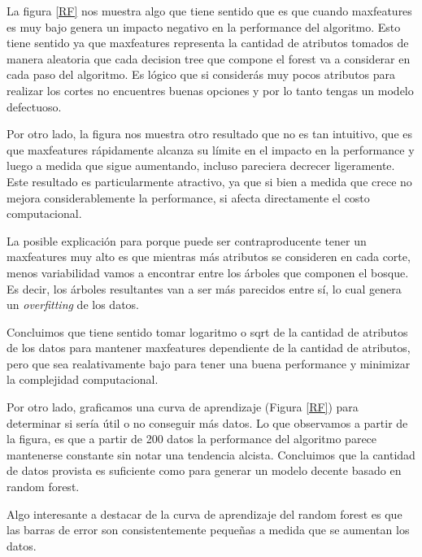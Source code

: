La figura \ref{RF} nos muestra algo que tiene sentido que es que cuando maxfeatures es muy bajo genera un impacto negativo en la performance del algoritmo. Esto tiene sentido ya que maxfeatures representa la cantidad de atributos tomados de manera aleatoria que cada decision tree que compone el forest va a considerar en cada paso del algoritmo. Es lógico que si considerás muy pocos atributos para realizar los cortes no encuentres buenas opciones y por lo tanto tengas un modelo defectuoso.

Por otro lado, la figura nos muestra otro resultado que no es tan intuitivo, que es que maxfeatures rápidamente alcanza su límite en el impacto en la performance y luego a medida que sigue aumentando, incluso pareciera decrecer ligeramente. Este resultado es particularmente atractivo, ya que si bien a medida que crece no mejora considerablemente la performance, si afecta directamente el costo computacional. 

La posible explicación para porque puede ser contraproducente tener un maxfeatures muy alto es que mientras más atributos se consideren en cada corte, menos variabilidad vamos a encontrar entre los árboles que componen el bosque. Es decir, los árboles resultantes van a ser más parecidos entre sí, lo cual genera un \textit{overfitting} de los datos.  

Concluimos que tiene sentido tomar logaritmo o sqrt de la cantidad de atributos de los datos para mantener maxfeatures dependiente de la cantidad de atributos, pero que sea realativamente bajo para tener una buena performance y minimizar la complejidad computacional.  

Por otro lado, graficamos una curva de aprendizaje (Figura \ref{RF}) para determinar si sería útil o no conseguir más datos. Lo que observamos a partir de la figura, es que a partir de 200 datos la performance del algoritmo parece mantenerse constante sin notar una tendencia alcista. Concluimos que la cantidad de datos provista es suficiente como para generar un modelo decente basado en random forest. 

Algo interesante a destacar de la curva de aprendizaje del random forest es que las barras de error son consistentemente pequeñas a medida que se aumentan los datos. 